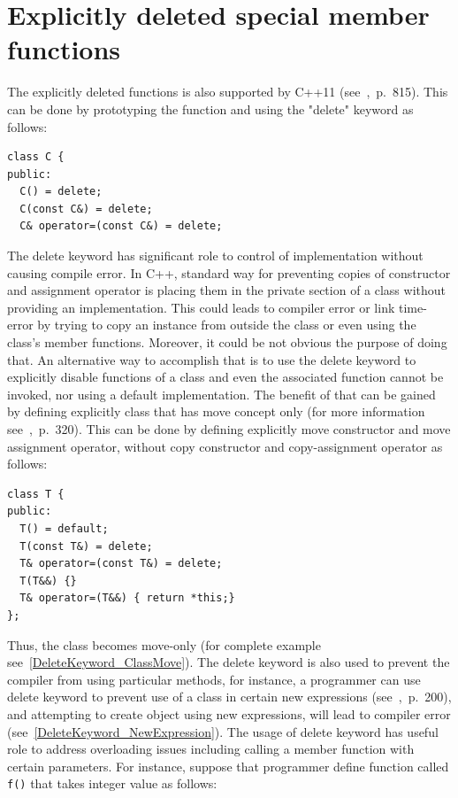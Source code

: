 \documentclass[11pt]{report}
\begin{document}
\section{Explicitly deleted special member functions}
\label{section: Deleted special member functions}
The explicitly deleted functions is also supported by C++11 (see~\cite{Horstmann:2008:BC},~p.~815). This can be done by prototyping the function and using the "delete" keyword as follows:
\begin{lstlisting}
class C {
public:
  C() = delete; 
  C(const C&) = delete; 
  C& operator=(const C&) = delete;
\end{lstlisting}
The delete keyword has significant role to control of implementation without causing compile error. In C++, standard way for preventing copies of constructor and assignment operator is placing them in the private section of a class without providing an implementation. This could leads to compiler error or link time-error by trying to copy an instance from outside the class or even using the class's member functions. Moreover, it could be not obvious the purpose of doing that. An alternative way to accomplish that is to use the delete keyword to explicitly disable functions of a class and even the associated function cannot be invoked, nor using a default implementation. The benefit of that can be gained by defining explicitly class that has move concept only (for more information see~\cite{Williams:2012:CCA},~p.~320). This can be done by defining explicitly move constructor and move assignment operator, without copy constructor and copy-assignment operator as follows:
\begin{lstlisting}
class T {
public:
  T() = default;
  T(const T&) = delete;
  T& operator=(const T&) = delete;
  T(T&&) {}
  T& operator=(T&&) { return *this;}
};
\end{lstlisting}
Thus, the class becomes move-only (for complete example see~\ref{DeleteKeyword_ClassMove}). The delete keyword is also used to prevent the compiler from using particular methods, for instance, a programmer can use delete keyword to prevent use of a class in certain new expressions (see~\cite{ISO:2011:Cpplanguage},~p.~200), and attempting to create object using new expressions, will lead to compiler error (see~\ref{DeleteKeyword_NewExpression}). The usage of delete keyword has useful role to address overloading issues including calling a member function with certain parameters. For instance, suppose that programmer define function called \texttt{f()} that takes integer value as follows:
\end{document}
